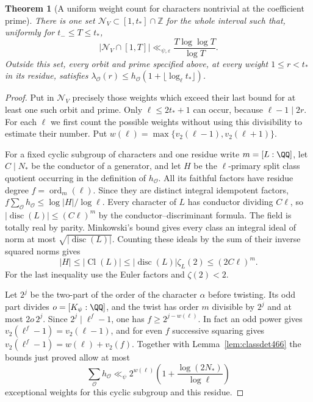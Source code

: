 \documentclass[a4paper,11pt]{article}
\newtheorem{theorem}[proposition]{Theorem}
\theoremstyle{definition}
\theoremstyle{remark}
\newcommand{\ZZ}{\mathbb Z}\newcommand{\ord}{\operatorname{ord}}
\numberwithin{equation}{section}
\newcommand{\Cl}{\operatorname{Cl}}
\begin{document}
\begin{theorem}[A uniform weight count for characters nontrivial at the coefficient prime]\leavevmode
\label{thm:nonsplitprefix466}
There is one set \(\mathcal N_V\subset[1,t_*]\cap\ZZ\) for the
whole interval such that, uniformly for \(t_-\le T\le t_*\),
\[
       |\mathcal N_V\cap[1,T]|
          \ll_{\psi,\varepsilon} \frac{T\log\log T}{\log T}.
\]
Outside this set, every orbit and prime specified above, at every
weight \(1\le r<t_*\) in its residue, satisfies
\(\lambda_{\mathcal O}(r)\le
h_{\mathcal O}(1+\lfloor\log_\ell t_*\rfloor)\).
\end{theorem}
\begin{proof}
Put in \(\mathcal N_V\) precisely those weights which exceed
their last bound for at least one such orbit and prime. Only
\(\ell\le2t_*+1\) can occur, because \(\ell-1\mid2r\).
For each \(\ell\) we first count the possible weights without
using this divisibility to estimate their number. Put
\(w(\ell)=\max\{v_2(\ell-1),v_2(\ell+1)\}\).

For a fixed cyclic subgroup of characters and one residue write
\(m=[L:\QQ]\), let \(C\mid N_*\) be the conductor of a
generator, and let \(H\) be the \(\ell\)-primary split class
quotient occurring in the definition of \(h_{\mathcal O}\).
All its faithful factors have residue degree
\(f=\operatorname{ord}_m(\ell)\). Since they are distinct
integral idempotent factors, \(f\sum_{\mathcal O}h_{\mathcal O}
\le\log|H|/\log\ell\). Every character of \(L\) has conductor
dividing \(C\ell\), so \(|\operatorname{disc}(L)|\le(C\ell)^m\)
by the conductor--discriminant formula. The field is totally real
by parity. Minkowski's bound gives every class an integral ideal
of norm at most \(\sqrt{|\operatorname{disc}(L)|}\). Counting
these ideals by the sum of their inverse squared norms gives
\[
  |H|\le|\Cl(L)|\le|\operatorname{disc}(L)|\zeta_L(2)
                         \le(2C\ell)^m.
\]
For the last inequality use the Euler factors and \(\zeta(2)<2\).

Let \(2^j\) be the two-part of the order of the character
\(\alpha\) before twisting. Its odd part divides
\(o=[K_\psi:\QQ]\), and the twist has order \(m\) divisible
by \(2^j\) and at most \(2o\,2^j\). Since \(2^j\mid\ell^f-1\),
one has \(f\ge2^{j-w(\ell)}\). In fact an odd power gives
\(v_2(\ell^f-1)=v_2(\ell-1)\), and for even \(f\) successive
squaring gives \(v_2(\ell^f-1)=w(\ell)+v_2(f)\).
Together with Lemma~\ref{lem:classdet466} the bounds just proved
allow at most
\[
 \sum_{\mathcal O}h_{\mathcal O}
       \ll_\psi 2^{w(\ell)}
                      \left(1+\frac{\log(2N_*)}{\log\ell}\right)
\]
exceptional weights for this cyclic subgroup and this residue.


\end{proof}
\end{document}
